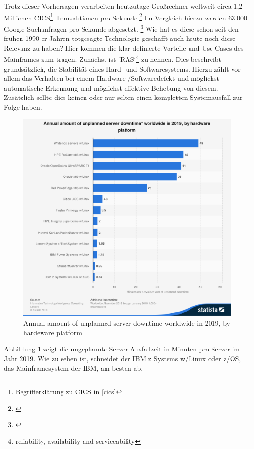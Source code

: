 Trotz dieser Vorhersagen verarbeiten heutzutage Großrechner weltweit circa 1,2 Millionen CICS\footnote{Begrifferklärung zu CICS in \ref{cics}} Transaktionen pro Sekunde.\footnote{\cite{IBM.2019}}
Im Vergleich hierzu werden 63.000 Google Suchanfragen pro Sekunde abgesetzt. \footnote{\cite{Sullivan.2016}}
Wie hat es diese schon seit den frühen 1990-er Jahren totgesagte Technologie geschafft auch heute noch diese Relevanz zu haben?
Hier kommen die klar definierte Vorteile und Use-Cases des Mainframes zum tragen.
Zunächst ist `RAS`\footnote{reliability, availability and serviceability} zu nennen.
Dies beschreibt grundsätzlich, die Stabilität eines Hard- und Softwaresystems.
Hierzu zählt vor allem das Verhalten bei einem Hardware-/Softwaredefekt und möglichst automatische Erkennung und möglichst effektive Behebung von diesem.
Zusätzlich sollte dies keinen oder nur selten einen kompletten Systemausfall zur Folge haben.
\begin{figure}[h]
	\centering
	\includegraphics[width=\textwidth]{figures/statistic_id515285_unplanned-server-downtime-globally-2019-by-hardware-platform.png}
	\caption{Annual amount of unplanned server downtime worldwide in 2019, by hardeware platform}
	\label{fig:serverdowntime}
\end{figure}
Abbildung \ref{fig:serverdowntime} zeigt die ungeplannte Server Ausfallzeit in Minuten pro Server im Jahr 2019.
Wie zu sehen ist, schneidet der IBM z Systems w/Linux oder z/OS, das Mainframesystem der IBM, am besten ab.


